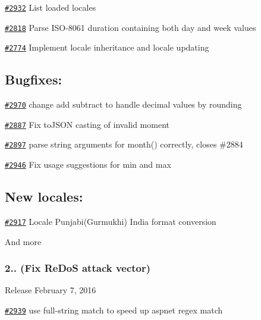 \begin{DoxyItemize}
\item \href{https://github.com/moment/moment/pull/2932}{\tt \#2932} List loaded locales
\item \href{https://github.com/moment/moment/pull/2818}{\tt \#2818} Parse I\+S\+O-\/8061 duration containing both day and week values
\item \href{https://github.com/moment/moment/pull/2774}{\tt \#2774} Implement locale inheritance and locale updating
\end{DoxyItemize}

\subsection*{Bugfixes\+:}


\begin{DoxyItemize}
\item \href{https://github.com/moment/moment/pull/2970}{\tt \#2970} change add subtract to handle decimal values by rounding
\item \href{https://github.com/moment/moment/pull/2887}{\tt \#2887} Fix to\+J\+S\+ON casting of invalid moment
\item \href{https://github.com/moment/moment/pull/2897}{\tt \#2897} parse string arguments for month() correctly, closes \#2884
\item \href{https://github.com/moment/moment/pull/2946}{\tt \#2946} Fix usage suggestions for min and max
\end{DoxyItemize}

\subsection*{New locales\+:}


\begin{DoxyItemize}
\item \href{https://github.com/moment/moment/pull/2917}{\tt \#2917} Locale Punjabi(\+Gurmukhi) India format conversion
\end{DoxyItemize}

And more

\subsubsection*{2.. (Fix Re\+DoS attack vector)}


\begin{DoxyItemize}
\item Release February 7, 2016
\item \href{https://github.com/moment/moment/pull/2939}{\tt \#2939} use full-\/string match to speed up aspnet regex match
\end{DoxyItemize}


